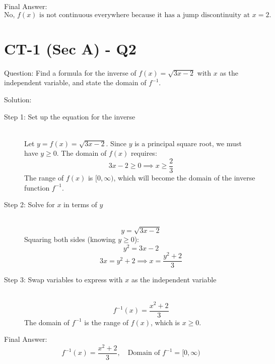 \documentclass[11pt, a4paper]{article}
\begin{document}
Final Answer:
\[ 
\boxed{\text{No, } f(x) \text{ is not continuous everywhere because it has a jump discontinuity at } x = 2.} 
\]



\section*{CT-1 (Sec A) - Q2}

Question:
Find a formula for the inverse of $f(x) = \sqrt{3x - 2}$ with $x$ as the independent variable, and state the domain of $f^{-1}$.

Solution:

\begin{description}
    \item[Step 1: Set up the equation for the inverse] \ \\
    Let $y = f(x) = \sqrt{3x - 2}$. Since $y$ is a principal square root, we must have $y \ge 0$.
    The domain of $f(x)$ requires:
    \[ 3x - 2 \ge 0 \implies x \ge \frac{2}{3} \]
    The range of $f(x)$ is $[0, \infty)$, which will become the domain of the inverse function $f^{-1}$.

    \item[Step 2: Solve for $x$ in terms of $y$] \ \\
    \[ y = \sqrt{3x - 2} \]
    Squaring both sides (knowing $y \ge 0$):
    \[ y^2 = 3x - 2 \]
    \[ 3x = y^2 + 2 \implies x = \frac{y^2 + 2}{3} \]

    \item[Step 3: Swap variables to express with $x$ as the independent variable] \ \\
    \[ f^{-1}(x) = \frac{x^2 + 2}{3} \]
    The domain of $f^{-1}$ is the range of $f(x)$, which is $x \ge 0$.
\end{description}

Final Answer:
\[ 
\boxed{f^{-1}(x) = \frac{x^2 + 2}{3}, \quad \text{Domain of } f^{-1} = [0, \infty)} 
\]
\end{document}
